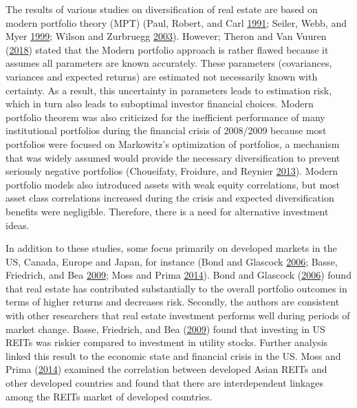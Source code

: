 \documentclass[11pt,preprint, authoryear]{elsarticle}
\numberwithin{equation}{section}
\numberwithin{figure}{section}
\numberwithin{table}{section}
\begin{document}
The results of various studies on diversification of real estate are
based on modern portfolio theory (MPT) (Paul, Robert, and Carl
\protect\hyperlink{ref-paul1991risk}{1991}; Seiler, Webb, and Myer
\protect\hyperlink{ref-seiler1999diversification}{1999}; Wilson and
Zurbruegg \protect\hyperlink{ref-wilson2003international}{2003}).
However; Theron and Van Vuuren
(\protect\hyperlink{ref-theron2018maximum}{2018}) stated that the Modern
portfolio approach is rather flawed because it assumes all parameters
are known accurately. These parameters (covariances, variances and
expected returns) are estimated not necessarily known with certainty. As
a result, this uncertainty in parameters leads to estimation risk, which
in turn also leads to suboptimal investor financial choices. Modern
portfolio theorem was also criticized for the inefficient performance of
many institutional portfolios during the financial crisis of 2008/2009
because most portfolios were focused on Markowitz's optimization of
portfolios, a mechanism that was widely assumed would provide the
necessary diversification to prevent seriously negative portfolios
(Choueifaty, Froidure, and Reynier
\protect\hyperlink{ref-choueifaty2013properties}{2013}). Modern
portfolio models also introduced assets with weak equity correlations,
but most asset class correlations increased during the crisis and
expected diversification benefits were negligible. Therefore, there is a
need for alternative investment ideas.

In addition to these studies, some focus primarily on developed markets
in the US, Canada, Europe and Japan, for instance (Bond and Glascock
\protect\hyperlink{ref-bond2006performance}{2006}; Basse, Friedrich, and
Bea \protect\hyperlink{ref-basse2009reits}{2009}; Moss and Prima
\protect\hyperlink{ref-moss2014asia}{2014}). Bond and Glascock
(\protect\hyperlink{ref-bond2006performance}{2006}) found that real
estate has contributed substantially to the overall portfolio outcomes
in terms of higher returns and decreases risk. Secondly, the authors are
consistent with other researchers that real estate investment performs
well during periods of market change. Basse, Friedrich, and Bea
(\protect\hyperlink{ref-basse2009reits}{2009}) found that investing in
US REITs was riskier compared to investment in utility stocks. Further
analysis linked this result to the economic state and financial crisis
in the US. Moss and Prima (\protect\hyperlink{ref-moss2014asia}{2014})
examined the correlation between developed Asian REITs and other
developed countries and found that there are interdependent linkages
among the REITs market of developed countries.
\end{document}
